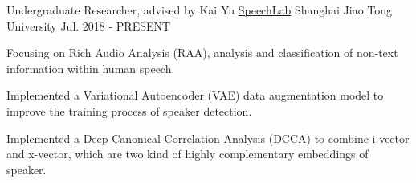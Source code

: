 \begin{cventries}
	\cventry
	{Undergraduate Researcher, advised by Kai Yu}
	{\href{https://speechlab.sjtu.edu.cn/}{SpeechLab}}
	{Shanghai Jiao Tong University}
	{Jul. 2018 - PRESENT}
	{
		\begin{cvitems}
			\item {Focusing on Rich Audio Analysis (RAA), analysis and classification of non-text information within human speech.}
            \item {Implemented a Variational Autoencoder (VAE) data augmentation model to improve the training process of speaker detection.}
            \item {Implemented a Deep Canonical Correlation Analysis (DCCA) to combine i-vector and x-vector, which are two kind of highly complementary embeddings of speaker.}
		\end{cvitems}
	}
\end{cventries}
